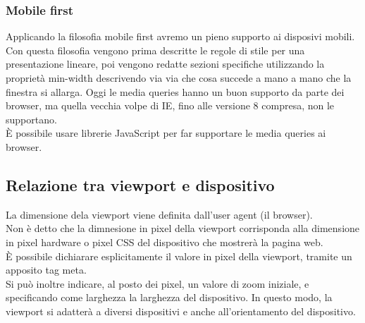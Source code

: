 \documentclass{article}
\begin{document}
\subsubsection{Mobile first}
Applicando la filosofia mobile first avremo un pieno supporto ai disposivi mobili.\\
Con questa filosofia vengono prima descritte le regole di stile per una presentazione lineare, poi vengono redatte sezioni specifiche utilizzando la proprietà min-width descrivendo via via che cosa succede a mano a mano che la finestra si allarga.
Oggi le media queries hanno un buon supporto da parte dei browser, ma quella vecchia volpe di IE, fino alle versione 8 compresa, non le supportano.\\
È possibile usare librerie JavaScript per far supportare le media queries ai browser.
\subsection{Relazione tra viewport e dispositivo}
La dimensione dela viewport viene definita dall'user agent (il browser).\\
Non è detto che la dimnesione in pixel della viewport corrisponda alla dimensione in pixel hardware o pixel CSS del dispositivo che mostrerà la pagina web.\\
È possibile dichiarare esplicitamente il valore in pixel della viewport, tramite un apposito tag meta.\\
Si può inoltre indicare, al posto dei pixel, un valore di zoom iniziale, e specificando come larghezza la larghezza del dispositivo. In questo modo, la viewport si adatterà a diversi dispositivi e anche all'orientamento del dispositivo.
\end{document}
